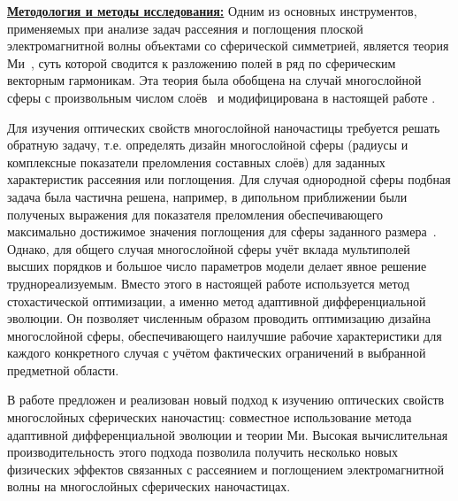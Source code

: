 \underline{\textbf{Методология и методы исследования:}} Одним из
основных инструментов, применяемых при анализе задач рассеяния и
поглощения плоской электромагнитной волны объектами со сферической
симметрией, является теория Ми~\cite{Mie-1908}, суть которой
сводится к разложению полей в ряд по сферическим векторным
гармоникам. Эта теория была обобщена на случай многослойной сферы с
произвольным числом слоёв~\cite{Yang-2003, Pena-scattnlay-2009} и
модифицирована в настоящей работе%
.

Для изучения оптических свойств многослойной наночастицы требуется
решать обратную задачу, т.е. определять дизайн многослойной сферы
(радиусы и комплексные показатели преломления составных слоёв) для
заданных характеристик рассеяния или поглощения. Для случая однородной
сферы подбная задача была частична решена, например, в дипольном
приближении были полученых выражения для показателя преломления
обеспечивающего максимально достижимое значения поглощения для сферы
заданного размера~\cite{Grigoriev-2015}. Однако, для
общего случая многослойной сферы учёт вклада мультиполей высших
порядков и большое число параметров модели делает явное решение
труднореализуемым. Вместо этого в настоящей работе используется
метод стохастической оптимизации, а именно метод адаптивной
дифференциальной эволюции. Он позволяет численным образом проводить
оптимизацию дизайна многослойной сферы, обеспечивающего наилучшие
рабочие характеристики для каждого конкретного случая с учётом
фактических ограничений в выбранной предметной области.

\novelty В работе предложен и реализован новый подход к изучению
оптических свойств многослойных сферических наночастиц: совместное
использование метода адаптивной дифференциальной эволюции и теории Ми.
Высокая вычислительная производительность этого подхода позволила
получить несколько новых физических эффектов связанных с рассеянием и
поглощением электромагнитной волны на многослойных сферических
наночастицах.

